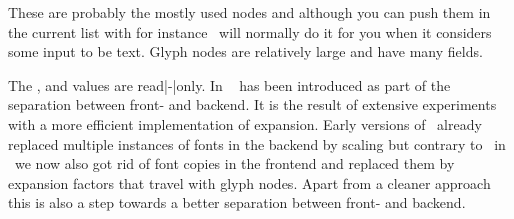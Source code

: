 

\stopsubsection

\startsubsection[title={glyph}]

These are probably the mostly used nodes and although you can push them in the
current list with for instance  \TEX\ will normally do it for you when
it considers some input to be text. Glyph nodes are relatively large and have many
fields.


The ,  and  values are read|-|only.
In \LUATEX\  has been introduced as part of the separation between
front- and backend. It is the result of extensive experiments with a more
efficient implementation of expansion. Early versions of \LUATEX\ already
replaced multiple instances of fonts in the backend by scaling but contrary to
\PDFTEX\ in \LUATEX\ we now also got rid of font copies in the frontend and
replaced them by expansion factors that travel with glyph nodes. Apart from a
cleaner approach this is also a step towards a better separation between front-
and backend.




